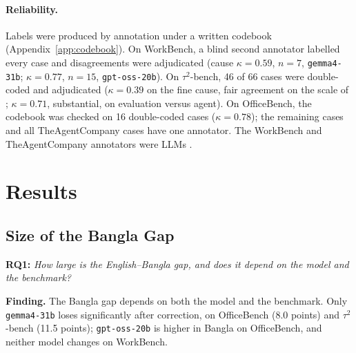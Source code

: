 \documentclass[11pt]{article}
\newif\ifshowverify
\newcommand{\verify}[1]{\ifshowverify{\color{red}\,[VERIFY: #1]}\fi}
\newcommand{\gemma}{\texttt{gemma4-31b}}
\newcommand{\gptoss}{\texttt{gpt-oss-20b}}
\newcommand{\OB}{OfficeBench}
\newcommand{\WB}{WorkBench}
\newcommand{\TAU}{$\tau^2$-bench}
\newcommand{\TAC}{TheAgentCompany}
\begin{document}
\paragraph{Reliability.} Labels were produced by annotation under a written codebook
(Appendix~\ref{app:codebook}). On \WB{}, a blind second annotator labelled every case and
disagreements were adjudicated (cause $\kappa=0.59$, $n=7$, \gemma{}; $\kappa=0.77$, $n=15$,
\gptoss{}). On \TAU{}, 46 of 66 cases were double-coded and adjudicated ($\kappa=0.39$ on the
fine cause, fair agreement on the scale of \citealp{landis1977}; $\kappa=0.71$, substantial, on
evaluation versus agent). On \OB{}, the codebook was checked on 16 double-coded cases
($\kappa=0.78$); the remaining cases and all \TAC{} cases have one annotator. The \WB{} and
\TAC{} annotators were LLMs \verify{annotator identity for \OB{} and \TAU{}; the draft's
$\kappa$ range 0.39--0.63 includes a value not found in the sources}.

\section{Results}

\subsection{Size of the Bangla Gap}
\label{sec:rq1}

\noindent\textbf{RQ1:} \emph{How large is the English--Bangla gap, and does it depend on the model and the benchmark?}

\noindent\textbf{Finding.} The Bangla gap depends on both the model and the benchmark. Only
\gemma{} loses significantly after correction, on \OB{} (8.0 points) and \TAU{} (11.5 points);
\gptoss{} is higher in Bangla on \OB{}, and neither model changes on \WB{}.
\end{document}
